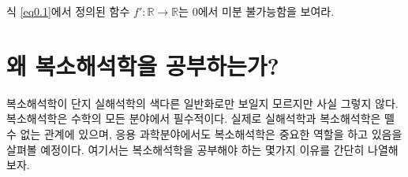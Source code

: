 \begin{salt_exercise} \label{ex-0-1}
식 \eqref{eq0.1}에서 정의된 함수 $f':\mathbb R \to \mathbb R$는 $0$에서 미분 불가능함을 보여라.
\end{salt_exercise}

\section*{왜 복소해석학을 공부하는가?}

복소해석학이 단지 실해석학의 색다른 일반화로만 보일지 모르지만 사실 그렇지 않다. 
복소해석학은 수학의 모든 분야에서 필수적이다.
실제로 실해석학과 복소해석학은 뗄 수 없는 관계에 있으며,
응용 과학분야에서도 복소해석학은 중요한 역할을 하고 있음을 살펴볼 예정이다.
여기서는 복소해석학을 공부해야 하는 몇가지 이유를 간단히 나열해보자.

